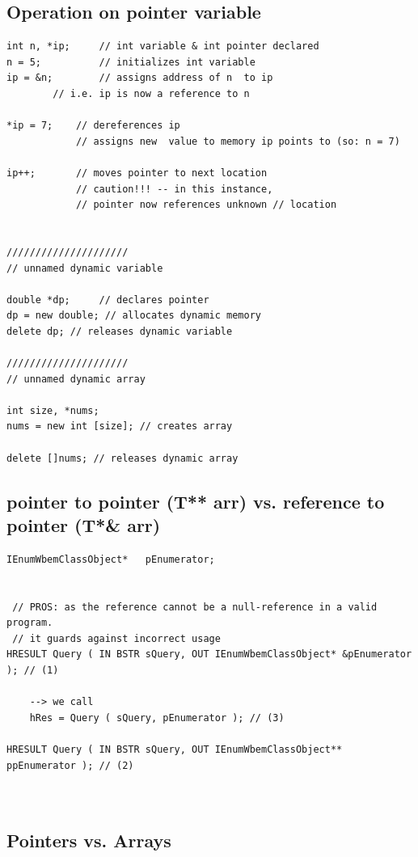 \subsection{Operation on pointer variable}

\begin{verbatim}
int n, *ip;		// int variable & int pointer declared
n = 5;			// initializes int variable
ip = &n;		// assigns address of n  to ip 
		// i.e. ip is now a reference to n

*ip = 7;	// dereferences ip
			// assigns new  value to memory ip points to (so: n = 7)

ip++;		// moves pointer to next location
			// caution!!! -- in this instance,
			// pointer now references unknown // location


/////////////////////
// unnamed dynamic variable

double *dp; 	// declares pointer
dp = new double; // allocates dynamic memory
delete dp; // releases dynamic variable

/////////////////////
// unnamed dynamic array

int size, *nums;
nums = new int [size]; // creates array

delete []nums; // releases dynamic array
\end{verbatim}

\subsection{pointer to pointer (T** arr) vs. reference to pointer (T*& arr)}
\label{sec:pointer-to-pointer}
\label{sec:reference-to-pointer}

\begin{lstlisting}
IEnumWbemClassObject*   pEnumerator;


 // PROS: as the reference cannot be a null-reference in a valid program. 
 // it guards against incorrect usage
HRESULT Query ( IN BSTR sQuery, OUT IEnumWbemClassObject* &pEnumerator ); // (1)

	--> we call
	hRes = Query ( sQuery, pEnumerator ); // (3)

HRESULT Query ( IN BSTR sQuery, OUT IEnumWbemClassObject** ppEnumerator ); // (2)

	
\end{lstlisting}


\subsection{Pointers vs. Arrays}
\label{sec:pointer-array}

